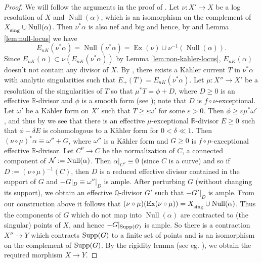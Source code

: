 \documentclass[12pt]{amsart}
\theoremstyle{plain}
\theoremstyle{remark}
\theoremstyle{definition}
\def\ve{\varepsilon}
\def\Null{\operatorname{Null}}
\newcommand{\<}{\leq}
\def\>{\geq}
\newcommand{\mbQ}{\mathbb{Q}}
\newcommand{\mbR}{\mathbb{R}}
\newcommand{\R}{{\mathbb{R}}}
\def\>{\geq}
\def\ve{\varepsilon}
\def\Ex{\operatorname{Ex}}
\def\sing{\operatorname{\textsubscript{sing}}}
\theoremstyle{definition}
\theoremstyle{definition}
\numberwithin{equation}{section}
\theoremstyle{remark}
\begin{document}
\begin{proof}
   We will follow the arguments in the proof of \cite[Theorem 7.12]{HP16}. Let $\nu :X'\to X$ be a log resolution of $X$ and $\Null(\alpha)$, which is an isomorphism on the complement of $X_\textsubscript{sing}\cup {\rm Null}(\alpha)$. Then $\nu ^*\alpha $ is also nef and big and hence, by \cite[Theorem 1.1]{CT15}  and Lemma \ref{lem:null-locus} we have
   \[ E_{nK}(\nu ^*\alpha )=\Null(\nu ^*\alpha)=\Ex(\nu)\cup \nu^{-1}(\Null(\alpha)).\]
Since $E_{nK}(\alpha )\subset \nu (E_{nK}(\nu ^*\alpha ))$ by Lemma \ref{lem:non-kahler-locus}, $E_{nK}(\alpha)$ doesn't not contain any divisor of $X$. By \cite[Theorem 3.17(ii)]{Bou04}, there exists a K\"ahler current $T$ in $\nu ^*\alpha$ with analytic singularities such that
$E_+(T ) = E_{nK} (\nu ^* \alpha )$. Let $\mu :X''\to X'$ be a resolution of the singularities of $T$ so that $\mu ^*T=\phi +D$, where $D\>0$ is an effective $\R$-divisor and $\phi$ is a smooth form (see \cite[Definition 2.5.1]{Bou04}); note that $D$ is $f\circ\nu$-exceptional.
Let $\omega'$ be a K\"ahler form on $X'$ such that $T\geq \ve\omega'$ for some $\ve>0$. Then $\phi\geq \ve\mu^*\omega'$, and thus by \cite[Lemma 2.9]{Bou02ar} we see that there is an effective $\mu$-exceptional $\mbR$-divisor $E\>0$ such that $\phi -\delta E$ is cohomologous to a K\"ahler form for $0<\delta \ll 1$. Then $(\nu \circ \mu) ^*\alpha \equiv \omega '' +G$, where $\omega ''$ is a K\"ahler form and $G\geq 0$ is $f \circ \mu$-exceptional effective $\mbR$-divisor.
Let $C^{\nu}\to C$ be the normalization of $C$, a connected component of $\mathcal N:={\rm Null}(\alpha)$. Then $\alpha |_{C^\nu}\equiv 0$ (since $C$ is a curve) and so if $D:=(\nu \circ \mu) ^{-1}(C)$, then $D$ is a reduced effective divisor contained in the support of $G$ and
$-G|_D\equiv \omega ''|_D$ is ample. After perturbing $G$ (without changing its support), we obtain an effective $\mbQ$-divisor $G'$ such that $-G'|_D$ is ample. From our construction above it follows that $(\nu\circ\mu)(\Ex(\nu\circ\mu))=X_{\sing}\cup\Null(\alpha)$. Thus the components of $G$ which do not map into $\Null(\alpha)$ are contracted to (the singular) points of $X$, and hence $-G|_{{\rm Supp}(G)}$ is ample. So there is a contraction $X''\to Y$ which contracts ${\rm Supp}(G)$ to a finite set of points and is an isomorphism on the complement of ${\rm Supp}(G)$. By the rigidity lemma (see eg. \cite[Lemma 4.1.13]{BS95}), we obtain the required morphism $X\to Y$.

\end{proof}
\end{document}
